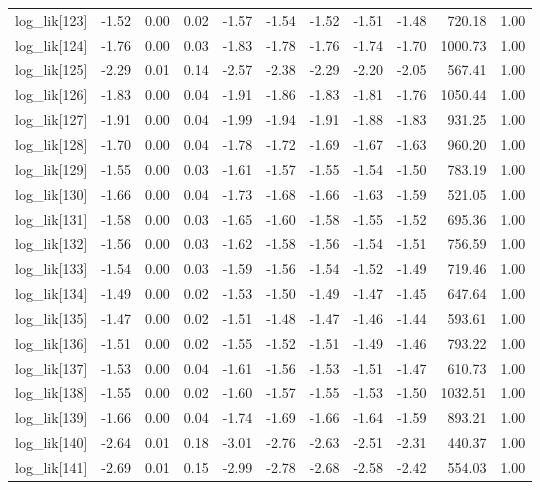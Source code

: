 \begin{table}[ht]
\begin{tabular}{rrrrrrrrrrr}
  log\_lik[123] & -1.52 & 0.00 & 0.02 & -1.57 & -1.54 & -1.52 & -1.51 & -1.48 & 720.18 & 1.00 \\ 
  log\_lik[124] & -1.76 & 0.00 & 0.03 & -1.83 & -1.78 & -1.76 & -1.74 & -1.70 & 1000.73 & 1.00 \\ 
  log\_lik[125] & -2.29 & 0.01 & 0.14 & -2.57 & -2.38 & -2.29 & -2.20 & -2.05 & 567.41 & 1.00 \\ 
  log\_lik[126] & -1.83 & 0.00 & 0.04 & -1.91 & -1.86 & -1.83 & -1.81 & -1.76 & 1050.44 & 1.00 \\ 
  log\_lik[127] & -1.91 & 0.00 & 0.04 & -1.99 & -1.94 & -1.91 & -1.88 & -1.83 & 931.25 & 1.00 \\ 
  log\_lik[128] & -1.70 & 0.00 & 0.04 & -1.78 & -1.72 & -1.69 & -1.67 & -1.63 & 960.20 & 1.00 \\ 
  log\_lik[129] & -1.55 & 0.00 & 0.03 & -1.61 & -1.57 & -1.55 & -1.54 & -1.50 & 783.19 & 1.00 \\ 
  log\_lik[130] & -1.66 & 0.00 & 0.04 & -1.73 & -1.68 & -1.66 & -1.63 & -1.59 & 521.05 & 1.00 \\ 
  log\_lik[131] & -1.58 & 0.00 & 0.03 & -1.65 & -1.60 & -1.58 & -1.55 & -1.52 & 695.36 & 1.00 \\ 
  log\_lik[132] & -1.56 & 0.00 & 0.03 & -1.62 & -1.58 & -1.56 & -1.54 & -1.51 & 756.59 & 1.00 \\ 
  log\_lik[133] & -1.54 & 0.00 & 0.03 & -1.59 & -1.56 & -1.54 & -1.52 & -1.49 & 719.46 & 1.00 \\ 
  log\_lik[134] & -1.49 & 0.00 & 0.02 & -1.53 & -1.50 & -1.49 & -1.47 & -1.45 & 647.64 & 1.00 \\ 
  log\_lik[135] & -1.47 & 0.00 & 0.02 & -1.51 & -1.48 & -1.47 & -1.46 & -1.44 & 593.61 & 1.00 \\ 
  log\_lik[136] & -1.51 & 0.00 & 0.02 & -1.55 & -1.52 & -1.51 & -1.49 & -1.46 & 793.22 & 1.00 \\ 
  log\_lik[137] & -1.53 & 0.00 & 0.04 & -1.61 & -1.56 & -1.53 & -1.51 & -1.47 & 610.73 & 1.00 \\ 
  log\_lik[138] & -1.55 & 0.00 & 0.02 & -1.60 & -1.57 & -1.55 & -1.53 & -1.50 & 1032.51 & 1.00 \\ 
  log\_lik[139] & -1.66 & 0.00 & 0.04 & -1.74 & -1.69 & -1.66 & -1.64 & -1.59 & 893.21 & 1.00 \\ 
  log\_lik[140] & -2.64 & 0.01 & 0.18 & -3.01 & -2.76 & -2.63 & -2.51 & -2.31 & 440.37 & 1.00 \\ 
  log\_lik[141] & -2.69 & 0.01 & 0.15 & -2.99 & -2.78 & -2.68 & -2.58 & -2.42 & 554.03 & 1.00 \\ 

\end{tabular}
\end{table}
